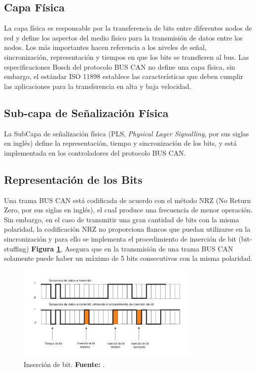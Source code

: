 \subsection{Capa Física}
La capa física es responsable por la transferencia de bits entre diferentes nodos de red y define los aspectos del medio físico para la transmisión de datos entre los nodos. 
Los más importantes hacen referencia a los niveles de señal, sincronización, representación y tiempos en que los bits se transfieren al bus. 
Las especificaciones Bosch del protocolo BUS CAN no define una capa física, sin embargo, el estándar  ISO 11898 establece las características que deben cumplir las aplicaciones para la transferencia en alta y baja velocidad.
 
\subsection{Sub-capa de Señalización Física}

La SubCapa de señalización física (PLS, \textit{Physical Layer Signalling}, por sus siglas en inglés) define la representación, tiempo y sincronización de los bits, y está implementada en los controladores del protocolo BUS CAN.


\subsection{Representación de los Bits}

Una trama BUS CAN está codificada de acuerdo con el método NRZ (No Return Zero, por sus siglas en inglés), el cual produce una frecuencia de menor operación. Sin embargo, en el caso de transmitir una gran cantidad de bits con la misma polaridad, la codificación NRZ no proporciona flancos que puedan utilizarse en la sincronización y para ello se implementa el procedimiento de inserción de bit (bit-stuffing) \textbf{Figura \ref{IB}}, Asegura que en la transmisión de una trama BUS CAN solamente puede haber un máximo de 5 bits consecutivos con la misma polaridad.



\begin{figure}[H]
	\centering
		\includegraphics[width=0.8\textwidth]{./Cap2imagen/insercionbit.pdf}
	\caption[Inserción de bit.]{Inserción de bit.\textbf{ Fuente:} \cite{DSEEPC}.}
	\label{IB} %
\end{figure}

